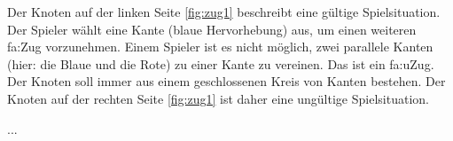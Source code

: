 Der Knoten auf der linken Seite \ref{fig:zug1} beschreibt eine gültige Spielsituation. Der Spieler wählt eine Kante (blaue Hervorhebung) aus, um einen weiteren \gls{fa:Zug} vorzunehmen.
Einem Spieler ist es nicht möglich, zwei parallele Kanten (hier: die Blaue und die Rote) zu einer Kante zu vereinen. Das ist ein \gls{fa:uZug}. Der Knoten soll immer aus einem geschlossenen Kreis von Kanten bestehen. Der Knoten auf der rechten Seite \ref{fig:zug1} ist daher eine ungültige Spielsituation.





...

\clearpage

